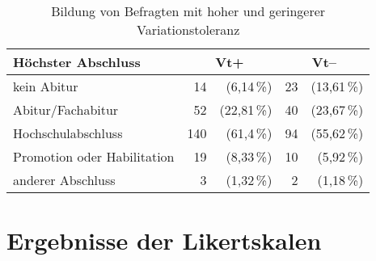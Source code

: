 \begin{table}
\centering
\begin{tabular}{lrrrr}
\textbf{Höchster Abschluss}                   & \multicolumn{2}{c}{\textbf{Vt+}} & \multicolumn{2}{c}{\textbf{Vt--}} \\ \hline
kein Abitur                 & 14             & (6,14\,\%)            & 23             & (13,61\,\%)            \\ %
Abitur/Fachabitur           & 52             & (22,81\,\%)           & 40             & (23,67\,\%)            \\ %
Hochschulabschluss          & 140            & (61,4\,\%)            & 94             & (55,62\,\%)            \\ %
Promotion oder Habilitation & 19             & (8,33\,\%)            & 10             & (5,92\,\%)             \\ %
anderer Abschluss           & 3              & (1,32\,\%)            & 2              & (1,18\,\%)             \\ 
\end{tabular}
\caption{Bildung von Befragten mit hoher und geringerer Variationstoleranz}
\label{table:AnhBildungundVt}
\end{table}
\newpage \section*{Ergebnisse der Likertskalen}

